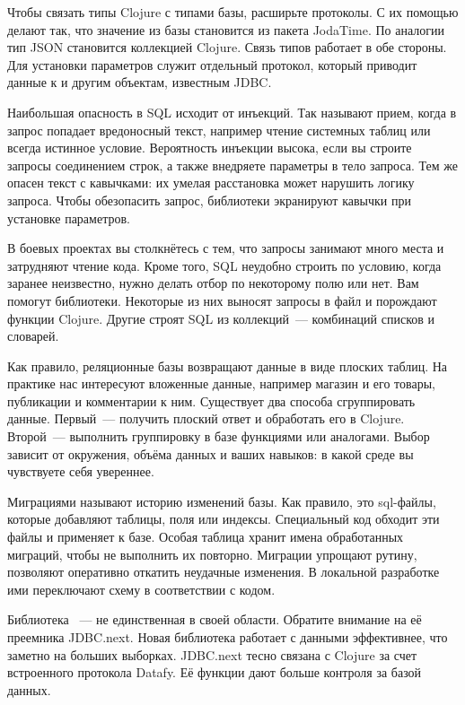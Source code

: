 Чтобы связать типы Clojure с типами базы, расширьте протоколы. С их помощью делают так, что значение  из базы становится  из пакета JodaTime. По аналогии тип JSON становится коллекцией Clojure. Связь типов работает в обе стороны. Для установки параметров служит отдельный протокол, который приводит данные к  и другим объектам, известным JDBC.

Наибольшая опасность в SQL исходит от инъекций. Так называют прием, когда в запрос попадает вредоносный текст, например чтение системных таблиц или всегда истинное условие. Вероятность инъекции высока, если вы строите запросы соединением строк, а также внедряете параметры в тело запроса. Тем же опасен текст с кавычками: их умелая расстановка может нарушить логику запроса. Чтобы обезопасить запрос, библиотеки экранируют кавычки при установке параметров.

В боевых проектах вы столкнётесь с тем, что запросы занимают много места и затрудняют чтение кода. Кроме того, SQL неудобно строить по условию, когда заранее неизвестно, нужно делать отбор по некоторому полю или нет. Вам помогут библиотеки. Некоторые из них выносят запросы в файл и порождают функции Clojure. Другие строят SQL из коллекций~--- комбинаций списков и словарей.

Как правило, реляционные базы возвращают данные в виде плоских таблиц. На практике нас интересуют вложенные данные, например магазин и его товары, публикации и комментарии к ним. Существует два способа сгруппировать данные. Первый~--- получить плоский ответ и обработать его в Clojure. Второй~--- выполнить группировку в базе функциями  или аналогами. Выбор зависит от окружения, объёма данных и ваших навыков: в какой среде вы чувствуете себя увереннее.

Миграциями называют историю изменений базы. Как правило, это sql-файлы, которые добавляют таблицы, поля или индексы. Специальный код обходит эти файлы и применяет к базе. Особая таблица хранит имена обработанных миграций, чтобы не выполнить их повторно. Миграции упрощают рутину, позволяют оперативно откатить неудачные изменения. В локальной разработке ими переключают схему в соответствии с кодом.

\iflarge
\thispagestyle{empty}
\fi

Библиотека ~--- не единственная в своей области. Обратите внимание на её преемника JDBC.next. Новая библиотека работает с данными эффективнее, что заметно на больших выборках. JDBC.next тесно связана с Clojure за счет встроенного протокола Datafy. Её функции дают больше контроля за базой данных.
